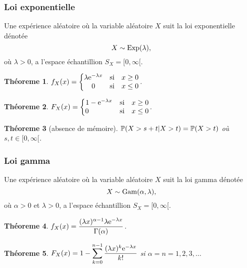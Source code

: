 \documentclass[11pt]{article}
\renewcommand\P{%
	\ensuremath{%
		\mathbb{P}%
	}%
}%
\newcommand\e{%
	\ensuremath{%
		\mathrm{e}%
	}%
}%
\newcommand\Exp{%
	\ensuremath{%
		\mathrm{Exp}%
	}%
}%
\newcommand\Gam{%
	\ensuremath{%
		\mathrm{Gam}%
	}%
}%
\newtheorem{theoreme}{Théoreme}[section]
\begin{document}
\subsubsection{Loi exponentielle}
Une expérience aléatoire où la variable aléatoire $X$ suit la loi exponentielle
dénotée
\begin{equation*}
	X\sim\Exp(\lambda),
\end{equation*}
où $\lambda>0$, a l'espace échantillion $S_X=[0,\infty[$.

\begin{theoreme}
	$f_X(x)=\left\{
		\begin{matrix}
			\lambda\e^{-\lambda x} &\text{si}& x\geq 0\\
			0                      &\text{si}& x\leq 0\\
		\end{matrix}
	\right.$.
\end{theoreme}

\begin{theoreme}
	$F_X(x)=\left\{
		\begin{matrix}
			1         -\e^{-\lambda x}      &\text{si}& x\geq 0\\
			0\phantom{-\e^{-\lambda x}}\;\; &\text{si}& x\leq 0\\
		\end{matrix}
	\right.$.
\end{theoreme}

\begin{theoreme}[absence de mémoire]
	$\P(X>s+t|X>t)=\P(X>t)$ où $s,t\in[0,\infty[$.
\end{theoreme}

\subsubsection{Loi gamma}
Une expérience aléatoire où la variable aléatoire $X$ suit la loi gamma dénotée
\begin{equation*}
	X\sim\Gam(\alpha,\lambda),
\end{equation*}
où $\alpha>0$ et $\lambda>0$, a l'espace échantillion $S_X=[0,\infty[$.

\begin{theoreme}
	$f_X(x)
	=\dfrac{(\lambda x)^{\alpha-1}\lambda\e^{-\lambda x}}{\Gamma(\alpha)}$.
\end{theoreme}

\begin{theoreme}
	$F_X(x)=1-\displaystyle\sum_{k=0}^{n-1}
		\dfrac{(\lambda x)^k\e^{-\lambda x}}{k!}$
	si $\alpha=n=1,2,3,\dots$
\end{theoreme}
\end{document}
